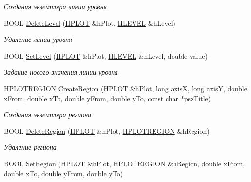 \begin{DoxyCompactItemize}
\begin{DoxyCompactList}\small\item\em Создания экземпляра линии уровня \end{DoxyCompactList}\item 
B\-O\-O\-L \hyperlink{group__gr_lvl_ex_ga1f2d9a5228e0b865b6bcc3b3d0929819}{Delete\-Level} (\hyperlink{classxyplot_1_1_h_p_l_o_t}{H\-P\-L\-O\-T} \&h\-Plot, \hyperlink{classxyplot_1_1_h_l_e_v_e_l}{H\-L\-E\-V\-E\-L} \&h\-Level)
\begin{DoxyCompactList}\small\item\em Удаление линии уровня \end{DoxyCompactList}\item 
B\-O\-O\-L \hyperlink{group__gr_lvl_ex_gae55f0c1003d6676c068b3c621c42c156}{Set\-Level} (\hyperlink{classxyplot_1_1_h_p_l_o_t}{H\-P\-L\-O\-T} \&h\-Plot, \hyperlink{classxyplot_1_1_h_l_e_v_e_l}{H\-L\-E\-V\-E\-L} \&h\-Level, double value)
\begin{DoxyCompactList}\small\item\em Задание нового значения линии уровня \end{DoxyCompactList}\item 
\hyperlink{classxyplot_1_1_h_p_l_o_t_r_e_g_i_o_n}{H\-P\-L\-O\-T\-R\-E\-G\-I\-O\-N} \hyperlink{group__gr_rgn_ex_ga7505d9ffcaedba6a7b8861b537e3eb23}{Create\-Region} (\hyperlink{classxyplot_1_1_h_p_l_o_t}{H\-P\-L\-O\-T} \&h\-Plot, \hyperlink{namespacexyplot_a27bc71b0bdfac09495e7e531d8a918c5}{long} axis\-X, \hyperlink{namespacexyplot_a27bc71b0bdfac09495e7e531d8a918c5}{long} axis\-Y, double x\-From, double x\-To, double y\-From, double y\-To, const char $\ast$psz\-Title)
\begin{DoxyCompactList}\small\item\em Создания экземпляра региона \end{DoxyCompactList}\item 
B\-O\-O\-L \hyperlink{group__gr_rgn_ex_ga752b100470bc7e465f283a957c67a24d}{Delete\-Region} (\hyperlink{classxyplot_1_1_h_p_l_o_t}{H\-P\-L\-O\-T} \&h\-Plot, \hyperlink{classxyplot_1_1_h_p_l_o_t_r_e_g_i_o_n}{H\-P\-L\-O\-T\-R\-E\-G\-I\-O\-N} \&h\-Region)
\begin{DoxyCompactList}\small\item\em Удаление региона \end{DoxyCompactList}\item 
B\-O\-O\-L \hyperlink{group__gr_rgn_ex_ga8e9c9b0cf069c241d4b3349ef7eec32b}{Set\-Region} (\hyperlink{classxyplot_1_1_h_p_l_o_t}{H\-P\-L\-O\-T} \&h\-Plot, \hyperlink{classxyplot_1_1_h_p_l_o_t_r_e_g_i_o_n}{H\-P\-L\-O\-T\-R\-E\-G\-I\-O\-N} \&h\-Region, double x\-From, double x\-To, double y\-From, double y\-To)

\end{DoxyCompactItemize}
